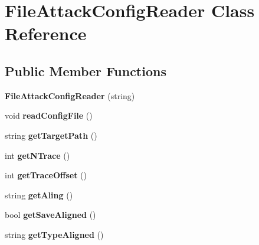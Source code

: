 \hypertarget{classFileAttackConfigReader}{
\section{FileAttackConfigReader Class Reference}
\label{classFileAttackConfigReader}
}
\subsection*{Public Member Functions}
\begin{DoxyCompactItemize}
\item 
\hypertarget{classFileAttackConfigReader_a02a12e11999efb34f79b594fe7a26e6c}{
{\bfseries FileAttackConfigReader} (string)}
\label{classFileAttackConfigReader_a02a12e11999efb34f79b594fe7a26e6c}

\item 
\hypertarget{classFileAttackConfigReader_a3bf69ae44b513a353ab71ba45e795e0d}{
void {\bfseries readConfigFile} ()}
\label{classFileAttackConfigReader_a3bf69ae44b513a353ab71ba45e795e0d}

\item 
\hypertarget{classFileAttackConfigReader_ae730306ac7d5152baa128903050a3a18}{
string {\bfseries getTargetPath} ()}
\label{classFileAttackConfigReader_ae730306ac7d5152baa128903050a3a18}

\item 
\hypertarget{classFileAttackConfigReader_a478bd41165085808ad7fefd857b7228f}{
int {\bfseries getNTrace} ()}
\label{classFileAttackConfigReader_a478bd41165085808ad7fefd857b7228f}

\item 
\hypertarget{classFileAttackConfigReader_ac20c47cdb166e5257a2761d0c6ff15d1}{
int {\bfseries getTraceOffset} ()}
\label{classFileAttackConfigReader_ac20c47cdb166e5257a2761d0c6ff15d1}

\item 
\hypertarget{classFileAttackConfigReader_af5b7a2bdc4d239ad1a5f0b31cfd2bae8}{
string {\bfseries getAling} ()}
\label{classFileAttackConfigReader_af5b7a2bdc4d239ad1a5f0b31cfd2bae8}

\item 
\hypertarget{classFileAttackConfigReader_a5b44b53f69aab6c402b7ec4a7fe74713}{
bool {\bfseries getSaveAligned} ()}
\label{classFileAttackConfigReader_a5b44b53f69aab6c402b7ec4a7fe74713}

\item 
\hypertarget{classFileAttackConfigReader_abb6f4c7e7dde181ead0dd537ab1e9724}{
string {\bfseries getTypeAligned} ()}
\label{classFileAttackConfigReader_abb6f4c7e7dde181ead0dd537ab1e9724}


\end{DoxyCompactItemize}

